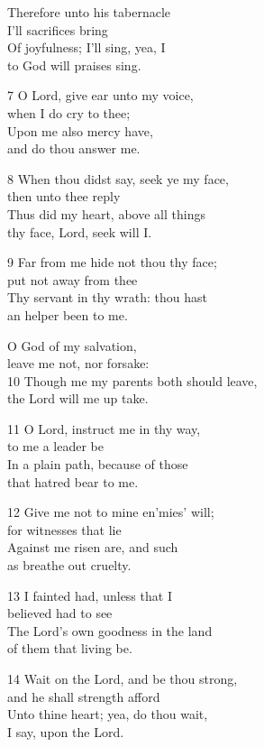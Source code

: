 Therefore unto his tabernacle\\
I’ll sacrifices bring\\
Of joyfulness; I’ll sing, yea, I\\
to God will praises sing.

7 O Lord, give ear unto my voice,\\
when I do cry to thee;\\
Upon me also mercy have,\\
and do thou answer me.

8 When thou didst say, seek ye my face,\\
then unto thee reply\\
Thus did my heart, above all things\\
thy face, Lord, seek will I.

9 Far from me hide not thou thy face;\\
put not away from thee\\
Thy servant in thy wrath: thou hast\\
an helper been to me.

O God of my salvation,\\
leave me not, nor forsake:\\
10 Though me my parents both should leave,\\
the Lord will me up take.

11 O Lord, instruct me in thy way,\\
to me a leader be\\
In a plain path, because of those\\
that hatred bear to me.

12 Give me not to mine en’mies’ will;\\
for witnesses that lie\\
Against me risen are, and such\\
as breathe out cruelty.

13 I fainted had, unless that I\\
believed had to see\\
The Lord’s own goodness in the land\\
of them that living be.

14 Wait on the Lord, and be thou strong,\\
and he shall strength afford\\
Unto thine heart; yea, do thou wait,\\
I say, upon the Lord.

\begin{center}
\quad{}\quad{}
\end{center}

